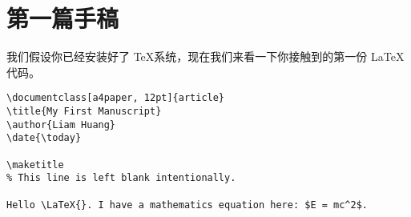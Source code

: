 \chapter{第一篇手稿}
\label{chap:hello_world}

我们假设你已经安装好了 \TeX 系统，现在我们来看一下你接触到的第一份 \LaTeX 代码。

\begin{lstlisting}[style = lltx, caption = {Hello \LaTeX{}}]
\documentclass[a4paper, 12pt]{article}
\title{My First Manuscript}
\author{Liam Huang}
\date{\today}

\maketitle
% This line is left blank intentionally.

Hello \LaTeX{}. I have a mathematics equation here: $E = mc^2$.

\end{lstlisting}
\endinput
